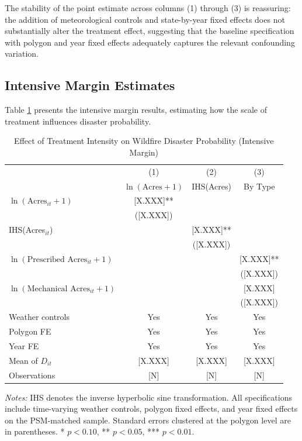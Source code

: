 \documentclass[12pt, letterpaper]{article}
\begin{document}
The stability of the point estimate across columns (1) through (3) is reassuring: the addition of meteorological controls and state-by-year fixed effects does not substantially alter the treatment effect, suggesting that the baseline specification with polygon and year fixed effects adequately captures the relevant confounding variation.

\subsection{Intensive Margin Estimates}

Table \ref{tab:intensive} presents the intensive margin results, estimating how the scale of treatment influences disaster probability.

\begin{table}[H]
\centering
\small
\begin{threeparttable}
\caption{Effect of Treatment Intensity on Wildfire Disaster Probability (Intensive Margin)}
\label{tab:intensive}
\begin{tabular}{lccc}
\toprule
& (1) & (2) & (3) \\
& $\ln(\text{Acres}+1)$ & IHS(Acres) & By Type \\
\midrule
$\ln(\text{Acres}_{it}+1)$ & [X.XXX]** & & \\
& ([X.XXX]) & & \\
IHS(Acres$_{it}$) & & [X.XXX]** & \\
& & ([X.XXX]) & \\
$\ln(\text{Prescribed Acres}_{it}+1)$ & & & [X.XXX]** \\
& & & ([X.XXX]) \\
$\ln(\text{Mechanical Acres}_{it}+1)$ & & & [X.XXX] \\
& & & ([X.XXX]) \\
\midrule
Weather controls & Yes & Yes & Yes \\
Polygon FE & Yes & Yes & Yes \\
Year FE & Yes & Yes & Yes \\
Mean of $D_{it}$ & [X.XXX] & [X.XXX] & [X.XXX] \\
Observations & [N] & [N] & [N] \\
\bottomrule
\end{tabular}
\begin{tablenotes}
\small
\item \textit{Notes:} IHS denotes the inverse hyperbolic sine transformation. All specifications include time-varying weather controls, polygon fixed effects, and year fixed effects on the PSM-matched sample. Standard errors clustered at the polygon level are in parentheses. * $p<0.10$, ** $p<0.05$, *** $p<0.01$.
\end{tablenotes}
\end{threeparttable}
\end{table}
\end{document}
